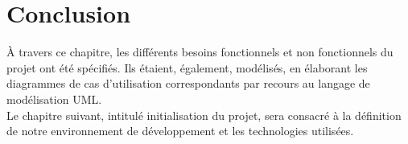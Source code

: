 \section*{Conclusion}
À travers ce chapitre, les différents besoins fonctionnels et non fonctionnels du projet ont été spécifiés. Ils étaient, également, modélisés, en élaborant les diagrammes de cas d’utilisation correspondants par recours au langage de modélisation UML.\\
Le chapitre suivant, intitulé initialisation du projet, sera consacré à la définition de notre environnement de développement et les technologies utilisées.

    
   